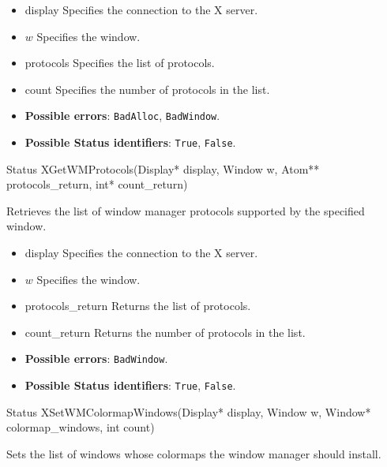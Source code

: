 \documentclass{report}
\begin{document}
\begin{itemize}
            \begin{itemize}
                \item display Specifies the connection to the X server.
                \item $w$ Specifies the window.
                \item protocols Specifies the list of protocols.
                \item count Specifies the number of protocols in the list.
            \end{itemize}

            \begin{itemize}
                \item \textbf{Possible errors}: \texttt{BadAlloc}, \texttt{BadWindow}.
                \item \textbf{Possible Status identifiers}: \texttt{True}, \texttt{False}.
            \end{itemize}

            \begin{cppcode}
                Status XGetWMProtocols(Display* display, Window w, Atom** protocols_return, int* count_return)
            \end{cppcode}
            \bigbreak \noindent
            Retrieves the list of window manager protocols supported by the specified window.

            \begin{itemize}
                \item display Specifies the connection to the X server.
                \item $w$ Specifies the window.
                \item protocols\_return Returns the list of protocols.
                \item count\_return Returns the number of protocols in the list.
            \end{itemize}

            \begin{itemize}
                \item \textbf{Possible errors}: \texttt{BadWindow}.
                \item \textbf{Possible Status identifiers}: \texttt{True}, \texttt{False}.
            \end{itemize}

            \begin{cppcode}
                Status XSetWMColormapWindows(Display* display, Window w, Window* colormap_windows, int count)
            \end{cppcode}
            \bigbreak \noindent
            Sets the list of windows whose colormaps the window manager should install.


\end{itemize}
\end{document}
